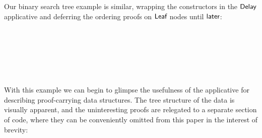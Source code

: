 \documentclass[sigplan]{acmart}%
\begin{document}
Our binary search tree example is similar,
wrapping the constructors in the $\AgdaDatatype{Delay}$ applicative
and deferring the ordering proofs 
on $\AgdaInductiveConstructor{Leaf}$ nodes until $\AgdaFunction{later}$:
\begin{code}
\>[2]\AgdaSpace{}%
\AgdaSymbol{:}\AgdaSpace{}%
\AgdaSpace{}%
\AgdaSymbol{(}\AgdaSpace{}%
\AgdaSpace{}%
\AgdaSymbol{)}\<%
\\
%
\>[2]\AgdaSpace{}%
\AgdaSymbol{=}\AgdaSpace{}%
\AgdaSpace{}%
\AgdaSpace{}%
\AgdaSpace{}%
\<%
\\
\\[\AgdaEmptyExtraSkip]%
%
\>[2]%
\>[800I]\AgdaSymbol{:}\AgdaSpace{}%
\AgdaSymbol{(}\AgdaSpace{}%
\AgdaSymbol{:}\AgdaSpace{}%
\AgdaSymbol{)}\AgdaSpace{}%
\AgdaSpace{}%
\AgdaSpace{}%
\AgdaSymbol{(}\AgdaSpace{}%
\AgdaSpace{}%
\AgdaSymbol{)}\AgdaSpace{}%
\AgdaSpace{}%
\AgdaSpace{}%
\AgdaSymbol{(}\AgdaSpace{}%
\AgdaSpace{}%
\AgdaSymbol{)}\<%
\\
\>[.][@{}l@{}]\<[800I]%
\>[9]\AgdaSpace{}%
\AgdaSpace{}%
\AgdaSymbol{(}\AgdaSpace{}%
\AgdaSpace{}%
\AgdaSymbol{)}\<%
\\
%
\>[2]\AgdaSpace{}%
\AgdaSpace{}%
\AgdaSpace{}%
\AgdaSpace{}%
\AgdaSymbol{=}\AgdaSpace{}%
\AgdaSpace{}%
\AgdaSymbol{(}\AgdaSpace{}%
\AgdaSymbol{)}\AgdaSpace{}%
\AgdaSpace{}%
\AgdaSpace{}%
\<%
%
\end{code}
With this example we can begin to glimpse the usefulness of the 
 applicative for describing proof-carrying data structures.
The tree structure of the data is visually apparent, and the uninteresting proofs are 
relegated to a separate section of code, where they can be conveniently omitted from 
this paper in the interest of brevity:
\end{document}
